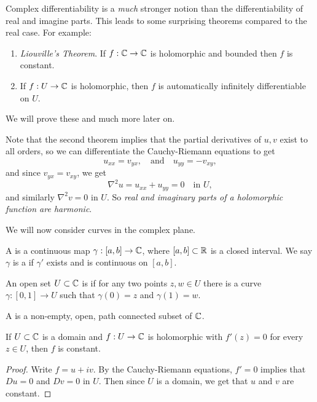 \documentclass[a4paper]{scrartcl}
\begin{document}
Complex differentiability is a \emph{much} stronger notion than the differentiability of real and imagine parts. This leads to some surprising theorems compared to the real case. For example: 
\begin{enumerate}[label=(\alph*)]
    \item \emph{Liouville's Theorem}. If $f: \mathbb{C} \rightarrow \mathbb{C}$ is holomorphic and bounded then $f$ is constant.
    \item If $f: U \rightarrow \mathbb{C}$ is holomorphic, then $f$ is automatically infinitely differentiable on $U$.
\end{enumerate}
We will prove these and much more later on.

\begin{remark}
Note that the second theorem implies that the partial derivatives of $u, v$ exist to all orders, so we can differentiate the Cauchy-Riemann equations to get
$$
u_{xx} = v_{yx}, \quad \text{and} \quad u_{yy} = -v_{xy},
$$
and since $v_{yx} = v_{xy}$, we get
$$
\nabla^2 u = u_{xx} + u_{yy} = 0 \quad \text{in }U, 
$$
and similarly $\nabla^2 v = 0$ in $U$. So \emph{real and imaginary parts of a holomorphic function are harmonic}.
\end{remark}

We will now consider curves in the complex plane.

\begin{definition}[Curve]
A  is a continuous map $\gamma: [a, b] \rightarrow \mathbb{C}$, where $[a, b] \subset \mathbb{R}$ is a closed interval. We say $\gamma$ is a  if $\gamma'$ exists and is continuous on $[a, b]$. 
\end{definition}

\begin{definition}
    An open set $U \subset \mathbb{C}$ is  if for any two points $z, w \in U$ there is a curve $\gamma : [0, 1] \rightarrow U$ such that $\gamma(0) = z$ and $\gamma(1) = w$.
\end{definition}

\begin{definition}[Domain]
    A  is a non-empty, open, path connected subset of $\mathbb{C}$.
\end{definition}

\begin{corollary}
    If $U \subset \mathbb{C}$ is a domain and $f: U \rightarrow \mathbb{C}$ is holomorphic with $f'(z) = 0$ for every $z \in U$, then $f$ is constant.
\end{corollary}
\begin{proof}
    Write $f = u + iv$. By the Cauchy-Riemann equations, $f' = 0$ implies that $Du = 0$ and $Dv = 0$ in $U$. Then since $U$ is a domain, we get that $u$ and $v$ are constant.
\end{proof}
\end{document}
